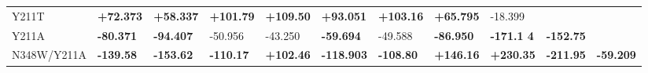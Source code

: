 \documentclass[12pt]{article}
\begin{document}
\begin {table}[H]
\begin{center}
{\begin{tabular}{l l l l l l l l l l l}
    Y211T       & \textbf{+72.373}     & \textbf{+58.337}        & \textbf{+101.79}        & \textbf{+109.50}        & \textbf{+93.051}        & \textbf{+103.16}          & \textbf{+65.795}        & -18.399                 &                         &        \\
    Y211A       & \textbf{-80.371}     & \textbf{-94.407}        & -50.956                 & -43.250                 & \textbf{-59.694}        & -49.588                   & \textbf{-86.950}        & \textbf{-171.1 4}       & \textbf{-152.75}        &        \\
    N348W/Y211A & \textbf{-139.58}     & \textbf{-153.62}        & \textbf{-110.17}        & \textbf{+102.46}        & \textbf{-118.903}       & \textbf{-108.80}          & \textbf{+146.16}        & \textbf{+230.35}        & \textbf{-211.95}        & \textbf{-59.209}  \\
    \hline
    \end{tabular}
  }
\end{center}
\end{table}
\end{document}
